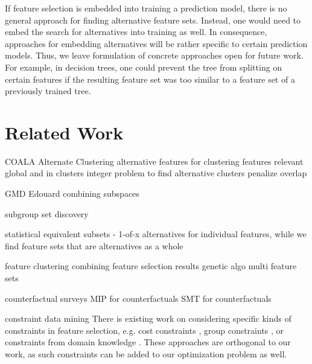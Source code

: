 \documentclass{article}
\theoremstyle{definition}
\begin{document}
If feature selection is embedded into training a prediction model, there is no general approach for finding alternative feature sets.
Instead, one would need to embed the search for alternatives into training as well.
In consequence, approaches for embedding alternatives will be rather specific to certain prediction models.
Thus, we leave formulation of concrete approaches open for future work.
For example, in decision trees, one could prevent the tree from splitting on certain features if the resulting feature set was too similar to a feature set of a previously trained tree.

\section{Related Work}
\label{sec:related-work}

COALA \cite{bae2006coala}
Alternate Clustering \cite{bailey2014alternative}
alternative features for clustering \cite{tao2012novel}
features relevant global and in clusters \cite{guan2011unified}
integer problem to find alternative clusters \cite{bae2010clustering}
penalize overlap \cite{mueller2009relevant}

GMD \cite{trittenbach2019dimension}
Edouard \cite{fouche2021efficient}
combining subspaces \cite{nguyen20134s}

subgroup set discovery \cite{leeuwen2012diverse}

statistical equivalent subsets \cite{lagani2017feature, borboudakis2021extending, tsamardinos2003towards, dougherty2006number} - 1-of-x alternatives for individual features, while we find feature sets that are alternatives as a whole

feature clustering \cite{mueller2021feature}
combining feature selection results \cite{woznica2012model}
genetic algo multi feature sets \cite{siddiqi2020genetic}

counterfactual surveys \cite{verma2020counterfactual, stepin2021survey}
MIP for counterfactuals \cite{mohammadi2021scaling}
SMT for counterfactuals \cite{karimi2020model}

constraint data mining \cite{grossi2017survey}
There is existing work on considering specific kinds of constraints in feature selection, e.g. cost constraints \cite{paclik2002feature}, group constraints \cite{yuan2006model}, or constraints from domain knowledge \cite{groves2015toward}.
These approaches are orthogonal to our work, as such constraints can be added to our optimization problem as well.
\end{document}
